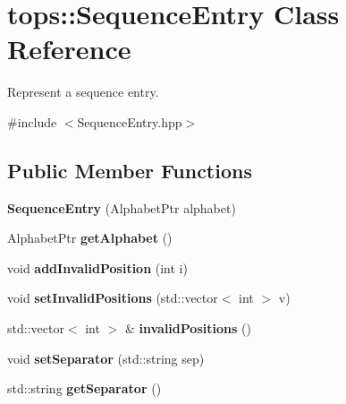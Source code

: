\hypertarget{classtops_1_1SequenceEntry}{}\section{tops\+:\+:Sequence\+Entry Class Reference}
\label{classtops_1_1SequenceEntry}


Represent a sequence entry.  




{\ttfamily \#include $<$Sequence\+Entry.\+hpp$>$}

\subsection*{Public Member Functions}
\begin{DoxyCompactItemize}
\item 
\mbox{\label{classtops_1_1SequenceEntry_a5ed47efa6adc4070477e6e9a3a0a2cd1}} 
{\bfseries Sequence\+Entry} (Alphabet\+Ptr alphabet)
\item 
\mbox{\label{classtops_1_1SequenceEntry_a801b50e40bf8685ff792e06fb4971d45}} 
Alphabet\+Ptr {\bfseries get\+Alphabet} ()
\item 
\mbox{\label{classtops_1_1SequenceEntry_a16a09a7ef5c595baae16404d53417f2f}} 
void {\bfseries add\+Invalid\+Position} (int i)
\item 
\mbox{\label{classtops_1_1SequenceEntry_a8a7510d4315be438a33222aa04517c2e}} 
void {\bfseries set\+Invalid\+Positions} (std\+::vector$<$ int $>$ v)
\item 
\mbox{\label{classtops_1_1SequenceEntry_a403074de92b4e9a412927c3b1fdc11d8}} 
std\+::vector$<$ int $>$ \& {\bfseries invalid\+Positions} ()
\item 
\mbox{\label{classtops_1_1SequenceEntry_a1f825e17cd70ba06162470167994e359}} 
void {\bfseries set\+Separator} (std\+::string sep)
\item 
\mbox{\label{classtops_1_1SequenceEntry_a9385b4e8c0f538c845de2c9437e84d94}} 
std\+::string {\bfseries get\+Separator} ()

\end{DoxyCompactItemize}
